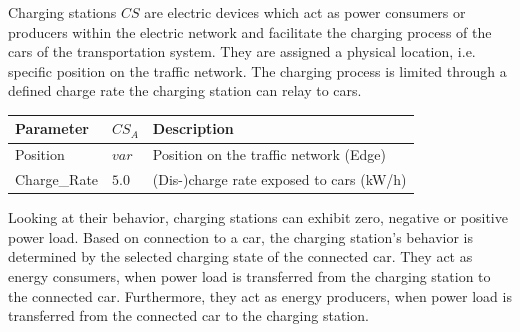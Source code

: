 Charging stations $CS$ are electric devices which act as power consumers or producers within the electric network and facilitate the charging process of the cars of the transportation system. They are assigned a physical location, i.e. specific position on the traffic network. The charging process is limited through a defined charge rate the charging station can relay to cars.

\begin{table}[h]
	\renewcommand{\arraystretch}{1.3}
	\centering
	\begin{tabular}{lll}
		\hline
		\textbf{Parameter}      & \textbf{$CS_{A}$} & \textbf{Description} \\ \hline
		Position      			& $var$ & Position on the traffic network (Edge) \\  
		Charge\_Rate        	& $5.0$ & (Dis-)charge rate exposed to cars (kW/h)     \\ \hline
	\end{tabular}
\end{table}

Looking at their behavior, charging stations can exhibit zero, negative or positive power load. Based on connection to a car, the charging station's behavior is determined by the selected charging state of the connected car. They act as energy consumers, when power load is transferred from the charging station to the connected car. Furthermore, they act as energy producers, when power load is transferred from the connected car to the charging station.